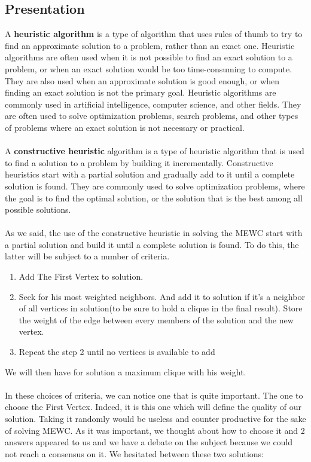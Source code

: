 
\subsection{Presentation}

    A \textbf{heuristic algorithm} is a type of algorithm that uses rules of thumb to try to find an approximate solution to a problem, rather than an exact one. Heuristic algorithms are often used when it is not possible to find an exact solution to a problem, or when an exact solution would be too time-consuming to compute. They are also used when an approximate solution is good enough, or when finding an exact solution is not the primary goal. Heuristic algorithms are commonly used in artificial intelligence, computer science, and other fields. They are often used to solve optimization problems, search problems, and other types of problems where an exact solution is not necessary or practical.
    \\ \\
    A \textbf{constructive heuristic} algorithm is a type of heuristic algorithm that is used to find a solution to a problem by building it incrementally. Constructive heuristics start with a partial solution and gradually add to it until a complete solution is found. They are commonly used to solve optimization problems, where the goal is to find the optimal solution, or the solution that is the best among all possible solutions.
    \\ \\
    As we said, the use of the constructive heuristic in solving the MEWC start with a partial solution and build it until a complete solution is found. To do this, the latter will be subject to a number of criteria. 

    \begin{enumerate}
        \item Add The First Vertex to solution.
        \item Seek for his most weighted neighbors. And add it to solution if it's a neighbor of all vertices in solution(to be sure to hold a clique in the final result). Store the weight of the edge between every members of the solution and the new vertex.
        \item Repeat the step 2 until no vertices is available to add
    \end{enumerate}

    We will then have for solution a maximum clique with his weight. 
    \\ \\
    In these choices of criteria, we can notice one that is quite important. The one to choose the First Vertex. Indeed, it is this one which will define the quality of our solution. Taking it randomly would be useless and counter productive for the sake of solving MEWC. As it was important, we thought about how to choose it and 2 answers appeared to us and we have a debate on the subject because we could not reach a consensus on it. We hesitated between these two solutions:

